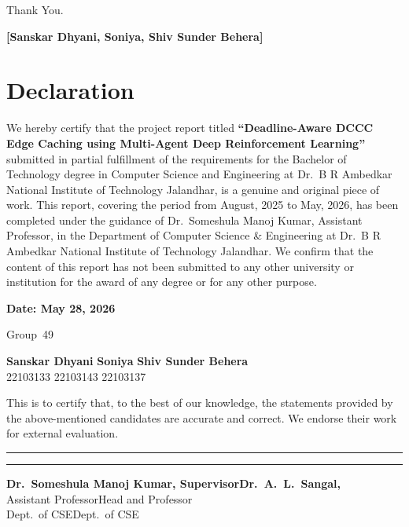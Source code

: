 \documentclass[12pt,a4paper]{report}
\begin{document}
Thank You.

\vspace{1cm}
\noindent\textbf{[Sanskar Dhyani, Soniya, Shiv Sunder Behera]}
\clearpage


\chapter*{Declaration}

We hereby certify that the project report titled \textbf{``Deadline-Aware DCCC Edge Caching using
Multi-Agent Deep Reinforcement Learning''} submitted in partial fulfillment of the requirements
for the Bachelor of Technology degree in Computer Science and Engineering at Dr.\ B R Ambedkar
National Institute of Technology Jalandhar, is a genuine and original piece of work. This report,
covering the period from August, 2025 to May, 2026, has been completed under the guidance of
Dr.\ Someshula Manoj Kumar, Assistant Professor, in the Department of Computer Science \&
Engineering at Dr.\ B R Ambedkar National Institute of Technology Jalandhar. We confirm that
the content of this report has not been submitted to any other university or institution for the
award of any degree or for any other purpose.

\vspace{1cm}
\noindent\textbf{Date: May 28, 2026}

\noindent Group~49

\vspace{0.8cm}
\noindent\textbf{Sanskar Dhyani} \hfill \textbf{Soniya} \hfill \textbf{Shiv Sunder Behera}\\{}
22103133 \hfill 22103143 \hfill 22103137

\vspace{2cm}
\noindent This is to certify that, to the best of our knowledge, the statements provided by the
above-mentioned candidates are accurate and correct. We endorse their work for external
evaluation.

\vspace{1.2cm}
\noindent\rule{6cm}{0.4pt}\hfill\rule{6cm}{0.4pt}

\noindent\textbf{Dr.\ Someshula Manoj Kumar, Supervisor}\hfill\textbf{Dr.\ A.\ L.\ Sangal,}\\{}
Assistant Professor\hfill Head and Professor\\
Dept.\ of CSE\hfill Dept.\ of CSE
\end{document}
